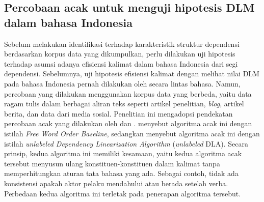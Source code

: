 \subsection{Percobaan acak untuk menguji hipotesis DLM dalam bahasa Indonesia}
Sebelum melakukan identifikasi terhadap karakteristik struktur dependensi berdasarkan korpus data yang dikumpulkan, perlu dilakukan uji hipotesis terhadap asumsi adanya efisiensi kalimat dalam bahasa Indonesia dari segi dependensi. Sebelumnya, uji hipotesis efisiensi kalimat dengan melihat nilai DLM pada bahasa Indonesia pernah dilakukan oleh \cite{futrell2015large} secara lintas bahasa. Namun, percobaan yang dilakukan \cite{futrell2015large} menggunakan korpus data yang berbeda, yaitu data ragam tulis dalam berbagai aliran teks seperti artikel penelitian, \textit{blog}, artikel berita, dan data dari media sosial. Penelitian ini mengadopsi pendekatan percobaan acak yang dilakukan oleh \cite{futrell2015large} dan \cite{gildea2010grammars}. \cite{futrell2015large} menyebut algoritma acak ini dengan istilah \textit{Free Word Order Baseline}, sedangkan \cite{gildea2010grammars} menyebut algoritma acak ini dengan istilah \textit{unlabeled Dependency Linearization Algorithm} (\textit{unlabeled} DLA). Secara prinsip, kedua algoritma ini memiliki kesamaan, yaitu kedua algoritma acak tersebut menyusun ulang konstituen-konstituen dalam kalimat tanpa memperhitungkan aturan tata bahasa yang ada. Sebagai contoh, tidak ada konsistensi apakah aktor pelaku mendahului atau berada setelah verba. Perbedaan kedua algoritma ini terletak pada penerapan algoritma tersebut. 

